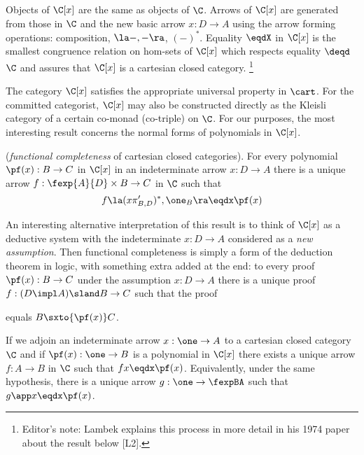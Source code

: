 Objects of $\C[x]$ are the same as objects of $\C$. Arrows of $\C[x]$ are
generated from those in $\C$ and the new basic arrow $x: D \to A$ using the arrow
forming operations: composition, $\la -,- \ra$, $(-)^*$. Equality $\eqdX$ in $\C[x]$ 
is the smallest congruence relation on hom-sets of $\C[x]$ which respects equality $\deqd$
$\C$ and assures that $\C[x]$ is a cartesian closed category.%
\footnote{Editor's note: Lambek explains this process in more detail in his 1974 paper about the
result below [L2].}

The category $\C[x]$ satisfies the appropriate universal property in $\cart$.
For the committed categorist, $\C[x]$ may also be constructed directly as the
Kleisli category of a certain co-monad (co-triple) on $\C$. For our purposes, the
most interesting result concerns the normal forms of polynomials in $\C[x]$.

\begin{prop}
({\em functional completeness} of cartesian closed categories).
For every polynomial $\pf(x): B \to C$
in $\C[x]$ in an indeterminate arrow
$x: D \to A$ there is a unique arrow $f: \fexp{A}{D} \times B \to C$ in $\C$
such that
\[
f\la (x\pi'_{B,D})^*, \one_B\ra \eqdx \pf(x)
\]
\end{prop}

An interesting alternative interpretation of this result is to think of
$\C[x]$ as a deductive system with the indeterminate $x: D \to A$
considered as a {\em new assumption}. Then functional completeness is
simply a form of the deduction theorem in logic,
with something extra added at the end: to every proof
$\pf(x): B \to C$ under the assumption $x: D \to A$ there is a unique
proof $f: (D \impl A) \sland B \to C$ such that the proof
\def\extraVskip{4pt}
\def\defaultHypSeparation{\hskip .1in}
\begin{prooftree}
\end{prooftree}
equals $B \sxto{\pf(x)} C$.

\begin{cor}
If we adjoin an indeterminate arrow $x: \one \to A$ to a
cartesian closed category $\C$ and if $\pf(x) : \one \to B$ is a polynomial in $\C[x]$
there exists a unique arrow $f: A \to B$ in $\C$ such that $fx \eqdx\pf(x)$.
Equivalently, under the same hypothesis, there is a unique arrow $g: \one \to \fexpBA$ such
that $g\app x \eqdx \pf(x)$.
\end{cor}

